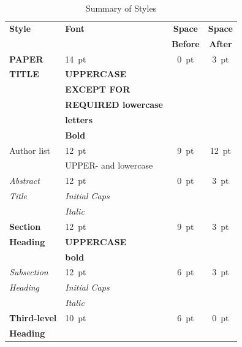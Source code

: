 \documentclass[a4paper,
               nospread,     %
               ]{jacow}
\begin{document}
  \begin{table}[h!b]
	\setlength\tabcolsep{3.5pt}
	\centering
	\caption{Summary of Styles}
	\label{tab:styles}
	\begin{tabular}{llcc}
		\toprule
		\textbf{Style} & \textbf{Font}               & \textbf{Space}  & \textbf{Space} \\
		&                             & \textbf{Before} & \textbf{After} \\
		\midrule
		\textbf{PAPER}  & \SI{14}{pt}                 & \SI{0}{pt}      & \SI{3}{pt}  \\
		\textbf{TITLE}  & \textbf{UPPERCASE}          &                 &      \\
		& \textbf{EXCEPT FOR}         &                 &      \\
		& \textbf{REQUIRED lowercase} &                 &      \\
		& \textbf{letters}            &                 &      \\
		& \textbf{Bold}               &                 &      \\[5pt]
		Author list  & \SI{12}{pt}                 & \SI{9}{pt}      & \SI{12}{pt} \\
		& UPPER- and lowercase        &                 &      \\[5pt]
		\textit{Abstract} & \SI{12}{pt}                 & \SI{0}{pt}      & \SI{3}{pt} \\
		\textit{Title}  & \textit{Initial Caps}       &                 &      \\
		& \textit{Italic}             &                 &      \\[5pt]
		\textbf{Section}  & \SI{12}{pt}                 & \SI{9}{pt}      & \SI{3}{pt}  \\
		\textbf{Heading}  & \textbf{UPPERCASE}          &                 &      \\
		& \textbf{bold}               &                 &      \\[5pt]
		\textit{Subsection} & \SI{12}{pt}                 & \SI{6}{pt}      & \SI{3}{pt}  \\
		\textit{Heading}
                             & \textit{Initial Caps}       &                 &      \\
		& \textit{Italic}             &                 &      \\[5pt]
		\textbf{Third-level} & \SI{10}{pt}                 & \SI{6}{pt}      & \SI{0}{pt}  \\
		\textbf{Heading}     

\end{tabular}
\end{table}
\end{document}
